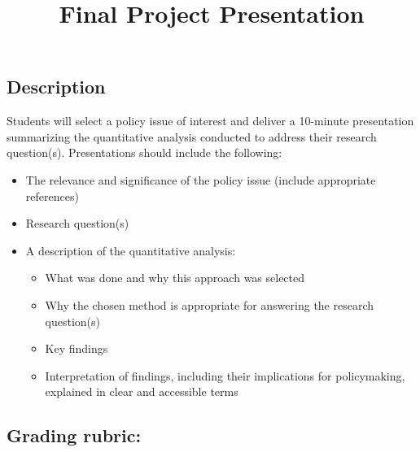 \documentclass[
]{article}
\title{Final Project Presentation}
\author{}
\date{\vspace{-2.5em}}
\providecommand{\tightlist}{%
  \setlength{\itemsep}{0pt}\setlength{\parskip}{0pt}}
\begin{document}
\maketitle

\subsection{Description}\label{description}

Students will select a policy issue of interest and deliver a 10-minute
presentation summarizing the quantitative analysis conducted to address
their research question(s). Presentations should include the following:

\begin{itemize}
\tightlist
\item
  The relevance and significance of the policy issue (include
  appropriate references)
\item
  Research question(s)
\item
  A description of the quantitative analysis:

  \begin{itemize}
  \tightlist
  \item
    What was done and why this approach was selected
  \item
    Why the chosen method is appropriate for answering the research
    question(s)
  \item
    Key findings
  \item
    Interpretation of findings, including their implications for
    policymaking, explained in clear and accessible terms
  \end{itemize}
\end{itemize}

\subsection{Grading rubric:}\label{grading-rubric}
\end{document}
